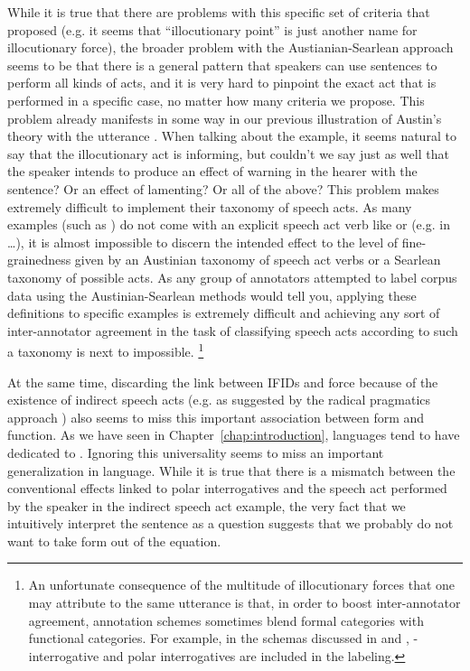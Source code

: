 While it is true that there are problems with this specific set of criteria that \textcite{searlevanderveken1985} proposed (e.g. it seems that ``illocutionary point'' is just another name for illocutionary force), the broader problem with the Austianian-Searlean approach seems to be that there is a general pattern that speakers can use sentences to perform all kinds of acts, and it is very hard to pinpoint the exact act that is performed in a specific case, no matter how many criteria we propose. This problem already manifests in some way in our previous illustration of Austin's theory with the utterance . When talking about the example, it seems natural to say that the illocutionary act is informing, but couldn’t we say just as well that the speaker intends to produce an effect of warning in the hearer with the sentence? Or an effect of lamenting? Or all of the above? This problem makes extremely difficult to implement their taxonomy of speech acts. As many examples (such as ) do not come with an explicit speech act verb like  or  (e.g. in  \ldots), it  is almost impossible to discern the intended effect to the level of fine-grainedness given by an Austinian taxonomy of speech act verbs or a Searlean taxonomy of possible acts. As any group of annotators attempted to label corpus data using the Austinian-Searlean methods would tell you, applying these definitions to specific examples is extremely difficult and achieving any sort of inter-annotator agreement in the task of classifying speech acts according to such a taxonomy is next to impossible. \footnote{An unfortunate consequence of the multitude of illocutionary forces that one may attribute to the same utterance is that, in order to boost inter-annotator agreement, annotation schemes sometimes blend formal categories with functional categories. For example, in the schemas discussed in \textcite{ninio1994} and \textcite{dialogact}, \twh-interrogative and polar interrogatives are included in the labeling.} 

At the same time, discarding the link between IFIDs and force because of the existence of indirect speech acts (e.g. as suggested by the radical pragmatics approach \cite{atlaslevinson1981, levinson1983}) also seems to miss this important association between form and function. As we have seen in Chapter~\ref{chap:introduction}, languages tend to have \diis{} dedicated to \aqrs{}. Ignoring this universality seems to miss an important generalization in language. While it is true that there is a mismatch between the conventional effects linked to polar interrogatives and the speech act performed by the speaker in the indirect speech act  example, the very fact that we intuitively interpret the sentence as a question suggests that we probably do not want to take form out of the equation.

